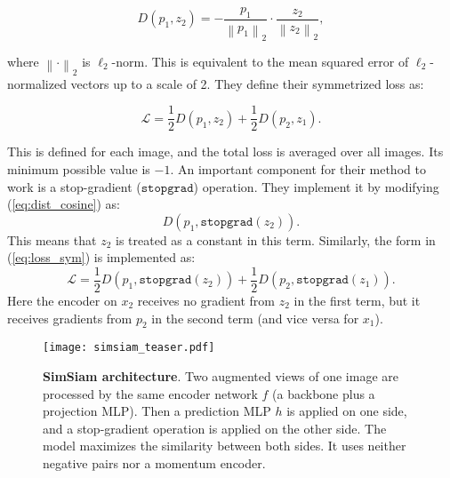 \documentclass[../thesis.tex]{subfiles}
\begin{document}
	
	\newcommand{\lnorm}[1]{\frac{#1}{\left\lVert{#1}\right\rVert _2}}
	\newcommand{\lnormv}[1]{{#1}/{\left\lVert{#1}\right\rVert _2}}
	
	\begin{equation}
	D(p_1, z_2) = - \lnorm{p_1}{\cdot}\lnorm{z_2},
	\label{eq:dist_cosine}
	\end{equation}
	
	where ${\left\lVert{\cdot}\right\rVert _2}$ is $\ell_2$-norm. This is equivalent to the mean squared error of $\ell_2$-normalized vectors up to a scale of 2. They define their symmetrized loss as:
	
	\begin{equation}
	\mathcal{L} = \frac{1}{2}D(p_1, z_2) + \frac{1}{2}D(p_2, z_1).
	\label{eq:loss_sym}
	\end{equation} 
	
	This is defined for each image, and the total loss is averaged over all images. Its minimum possible value is $-1$. An important component for their method to work is a \mbox{stop-gradient} ($\texttt{stopgrad}$) operation. They implement it by modifying (\ref{eq:dist_cosine}) as:
	\begin{equation}
	D(p_1, \texttt{stopgrad}(z_2)).
	\label{eq:loss_asym_stopgrad}
	\end{equation}
	This means that $z_2$ is treated as a constant in this term.
	Similarly, the form in (\ref{eq:loss_sym}) is implemented as:
	\begin{equation}
	\mathcal{L}{=}\frac{1}{2}D(p_1, \texttt{stopgrad}(z_2)){+}\frac{1}{2}D(p_2, \texttt{stopgrad}(z_1)).
	\label{eq:loss_sym_stopgrad}
	\end{equation}
	Here the encoder on $x_2$ receives no gradient from $z_2$ in the first term, but it receives gradients from $p_2$ in the second term (and vice versa for $x_1$).
	
	\begin{figure}[t]
		\centering
		\vspace{-1em}
		\texttt{[image: simsiam\_teaser.pdf]}
		\vspace{-.5em}
		\caption{
			\textbf{SimSiam architecture}. Two augmented views of one image are processed by the same encoder network $f$ (a backbone plus a projection MLP). Then a prediction MLP $h$ is applied on one side, and a stop-gradient operation is applied on the other side. The model maximizes the similarity between both sides.
			It uses neither negative pairs nor a momentum encoder.
			\label{fig:simsiam_pipeline}
			\vspace{-.5em}
		}
	\end{figure}
\end{document}
